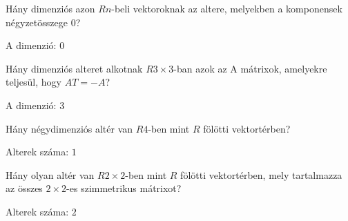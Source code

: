 \begin{frame}
  \begin{tcolorbox}[title={4/4. -R-}]
      Hány dimenziós azon $Rn$-beli vektoroknak az altere, melyekben a komponensek négyzetösszege $0$?
  \tcblower

    \mmedskip 
    
    A dimenzió: $0$
  \end{tcolorbox}
\end{frame}


\begin{frame}
  \begin{tcolorbox}[title={4/5. -Q-}]
      Hány dimenziós alteret alkotnak $R3×3$-ban azok az A mátrixok, amelyekre teljesül, hogy $AT = −A$?
  \tcblower

    \mmedskip 
    
    A dimenzió: $3$
  \end{tcolorbox}
\end{frame}


\begin{frame}
  \begin{tcolorbox}[title={4/6. -R-}]
      Hány négydimenziós altér van $R4$-ben mint $R$ fölötti vektortérben?
  \tcblower

    \mmedskip 
    
    Alterek száma: $1$
  \end{tcolorbox}
\end{frame}


\begin{frame}
  \begin{tcolorbox}[title={4/7. -Q-}]
      Hány olyan altér van $R2×2$-ben mint $R$ fölötti vektortérben, mely tartalmazza az összes $2 × 2$-es szimmetrikus mátrixot?
  \tcblower

    \mmedskip 
    
    Alterek száma: $2$
  \end{tcolorbox}
\end{frame}


